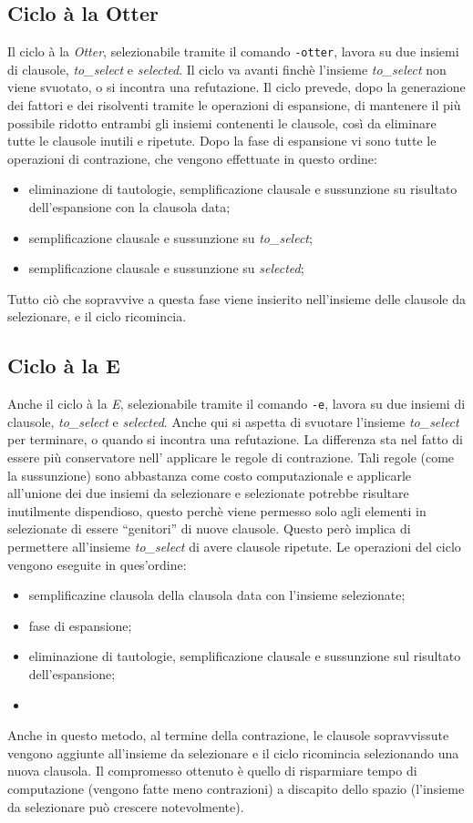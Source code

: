 \documentclass[a4paper,11pt]{article}
\begin{document}
\subsection{Ciclo à la Otter}
Il ciclo à la \emph{Otter}, selezionabile tramite il comando \texttt{-otter}, lavora su due insiemi di clausole, \emph{to\_select} e \emph{selected}. Il ciclo va avanti finchè l'insieme \emph{to\_select} non viene svuotato, o si incontra una refutazione. Il ciclo prevede, dopo la generazione dei fattori e dei risolventi tramite le operazioni di espansione, di mantenere il più possibile ridotto entrambi gli insiemi contenenti le clausole, così da eliminare tutte le clausole inutili e ripetute. Dopo la fase di espansione vi sono tutte le operazioni di contrazione, che vengono effettuate in questo ordine:
\begin{itemize}
\item eliminazione di tautologie, semplificazione clausale e sussunzione su risultato dell'espansione con la clausola data;
\item semplificazione clausale e sussunzione su \emph{to\_select};
\item semplificazione clausale e sussunzione su \emph{selected};
\end{itemize}
Tutto ciò che sopravvive a questa fase viene insierito nell'insieme delle clausole da selezionare, e il ciclo ricomincia.
\subsection{Ciclo à la E}
Anche il ciclo à la \emph{E}, selezionabile tramite il comando \texttt{-e}, lavora su due insiemi di clausole, \emph{to\_select} e \emph{selected}. Anche qui si aspetta di svuotare l'insieme \emph{to\_select} per terminare, o quando si incontra una refutazione. La differenza sta nel fatto di essere più conservatore nell’ applicare le regole di contrazione. Tali regole (come la sussunzione) sono abbastanza come costo computazionale e applicarle all’unione dei due insiemi da selezionare e selezionate potrebbe risultare inutilmente dispendioso, questo perchè viene permesso solo agli elementi in
selezionate di essere ``genitori'' di nuove clausole. Questo però implica di permettere all'insieme \emph{to\_select} di avere clausole ripetute. Le operazioni del ciclo vengono eseguite in ques'ordine:
\begin{itemize}
\item semplificazine clausola della clausola data con l'insieme selezionate;
\item fase di espansione;
\item eliminazione di tautologie, semplificazione clausale e sussunzione sul risultato dell'espansione; 
\item
\end{itemize}
Anche in questo metodo, al termine della contrazione, le clausole sopravvissute vengono aggiunte all’insieme da selezionare e il ciclo ricomincia selezionando una nuova clausola. Il compromesso
ottenuto è quello di risparmiare tempo di computazione (vengono fatte meno contrazioni) a discapito dello spazio (l’insieme da selezionare può crescere notevolmente).
\end{document}
